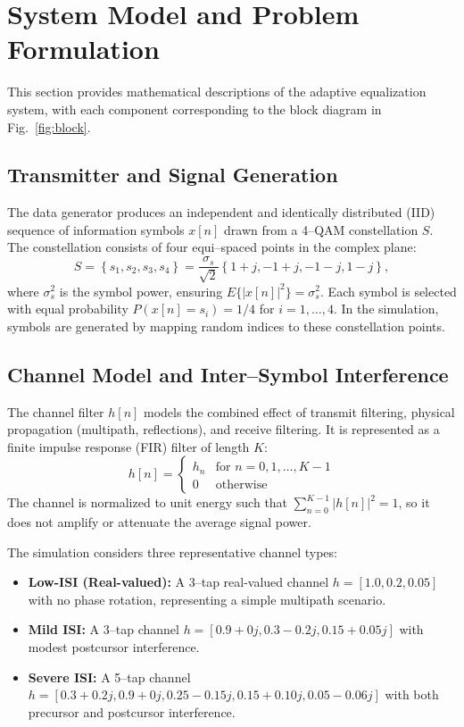 \documentclass[12pt]{article}
\begin{document}
\section{System Model and Problem Formulation}\label{sec:model}
This section provides mathematical descriptions of the adaptive equalization system, with each component corresponding to the block diagram in Fig.~\ref{fig:block}.

\subsection{Transmitter and Signal Generation}
The data generator produces an independent and identically distributed (IID) sequence of information symbols $x[n]$ drawn from a 4--QAM constellation $S$. The constellation consists of four equi--spaced points in the complex plane:
\begin{equation}
S = \left\{s_1, s_2, s_3, s_4\right\} = \frac{\sigma_s}{\sqrt{2}}\left\{1+j, -1+j, -1-j, 1-j\right\},
\end{equation}
where $\sigma_s^2$ is the symbol power, ensuring $E\{|x[n]|^2\} = \sigma_s^2$. Each symbol is selected with equal probability $P(x[n]=s_i) = 1/4$ for $i=1,\ldots,4$. In the simulation, symbols are generated by mapping random indices to these constellation points.

\subsection{Channel Model and Inter--Symbol Interference}
The channel filter $h[n]$ models the combined effect of transmit filtering, physical propagation (multipath, reflections), and receive filtering. It is represented as a finite impulse response (FIR) filter of length $K$:
\begin{equation}
h[n] = \begin{cases} h_n & \text{for } n=0,1,\ldots,K-1 \\ 0 & \text{otherwise} \end{cases}
\end{equation}
The channel is normalized to unit energy such that $\sum_{n=0}^{K-1}|h[n]|^2 = 1$, so it does not amplify or attenuate the average signal power.

The simulation considers three representative channel types:
\begin{itemize}
\item \textbf{Low-ISI (Real-valued):} A 3--tap real-valued channel $h = [1.0, 0.2, 0.05]$ with no phase rotation, representing a simple multipath scenario.
\item \textbf{Mild ISI:} A 3--tap channel $h = [0.9+0j, 0.3-0.2j, 0.15+0.05j]$ with modest postcursor interference.
\item \textbf{Severe ISI:} A 5--tap channel $h = [0.3+0.2j, 0.9+0j, 0.25-0.15j, 0.15+0.10j, 0.05-0.06j]$ with both precursor and postcursor interference.
\end{itemize}
\end{document}
